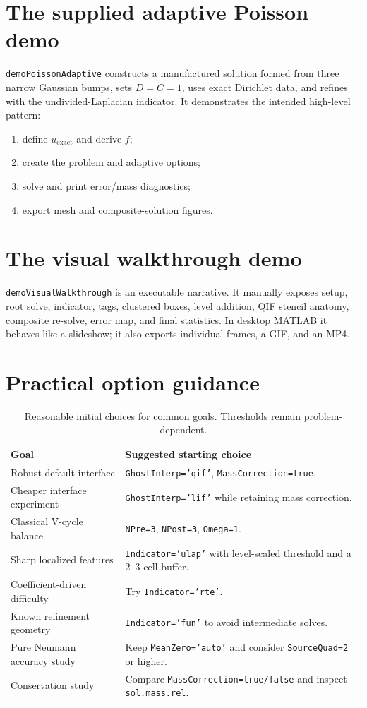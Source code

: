 \documentclass[11pt,oneside,openany]{book}
\newcommand{\code}[1]{\textnormal{\texttt{#1}}}
\begin{document}
\section{The supplied adaptive Poisson demo}
\code{demoPoissonAdaptive} constructs a manufactured solution formed from three narrow Gaussian bumps, sets $D=C=1$, uses exact Dirichlet data, and refines with the undivided-Laplacian indicator. It demonstrates the intended high-level pattern:
\begin{enumerate}[label=\arabic*.]
\item define $u_{\mathrm{exact}}$ and derive $f$;
\item create the problem and adaptive options;
\item solve and print error/mass diagnostics;
\item export mesh and composite-solution figures.
\end{enumerate}

\section{The visual walkthrough demo}
\code{demoVisualWalkthrough} is an executable narrative. It manually exposes setup, root solve, indicator, tags, clustered boxes, level addition, QIF stencil anatomy, composite re-solve, error map, and final statistics. In desktop MATLAB it behaves like a slideshow; it also exports individual frames, a GIF, and an MP4.

\section{Practical option guidance}
\begin{table}[htbp]
\centering
\small
\begin{tabularx}{\textwidth}{@{}p{}X@{}}
\toprule
Goal & Suggested starting choice \\
\midrule
Robust default interface & \code{GhostInterp='qif'}, \code{MassCorrection=true}. \\
Cheaper interface experiment & \code{GhostInterp='lif'} while retaining mass correction. \\
Classical V-cycle balance & \code{NPre=3}, \code{NPost=3}, \code{Omega=1}. \\
Sharp localized features & \code{Indicator='ulap'} with level-scaled threshold and a 2--3 cell buffer. \\
Coefficient-driven difficulty & Try \code{Indicator='rte'}. \\
Known refinement geometry & \code{Indicator='fun'} to avoid intermediate solves. \\
Pure Neumann accuracy study & Keep \code{MeanZero='auto'} and consider \code{SourceQuad=2} or higher. \\
Conservation study & Compare \code{MassCorrection=true/false} and inspect \code{sol.mass.rel}. \\
\bottomrule
\end{tabularx}
\caption{Reasonable initial choices for common goals. Thresholds remain problem-dependent.}
\end{table}
\end{document}
